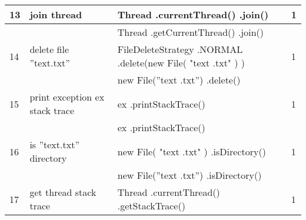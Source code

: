 \begin{longtable}{|p{}|p{}|p{}|p{}|}
		\rowcolor[HTML]{FFCCC9} 
		13                                & join thread                                            & Thread .currentThread() .join()                                                                                  & 1                                       \\ \hline
		\rowcolor[HTML]{9AFF99} 
		&                                                        & Thread .getCurrentThread() .join()                                                                               &                                         \\ \hline
		\rowcolor[HTML]{FFCCC9} 
		14                                & delete file ”text.txt”                                 & FileDeleteStrategy .NORMAL .delete(new File( "text .txt" ) )                                                     & 1                                       \\ \hline
		\rowcolor[HTML]{9AFF99} 
		&                                                        & new File(”text .txt”) .delete()                                                                                  &                                         \\ \hline
		\rowcolor[HTML]{FFCCC9} 
		15                                & print exception ex stack trace                         & ex  .printStackTrace()                                                                                           & 1                                       \\ \hline
		\rowcolor[HTML]{9AFF99} 
		&                                                        & ex .printStackTrace()                                                                                            &                                         \\ \hline
		\rowcolor[HTML]{FFCCC9} 
		16                                & is ”text.txt” directory                                & new File( "text .txt" ) .isDirectory()                                                                           & 1                                       \\ \hline
		\rowcolor[HTML]{9AFF99} 
		&                                                        & new File(”text .txt”) .isDirectory()                                                                             &                                         \\ \hline
		\rowcolor[HTML]{FFCCC9} 
		17                                & get thread stack trace                                 & Thread .currentThread() .getStackTrace()                                                                         & 1                                       \\ \hline

\end{longtable}
